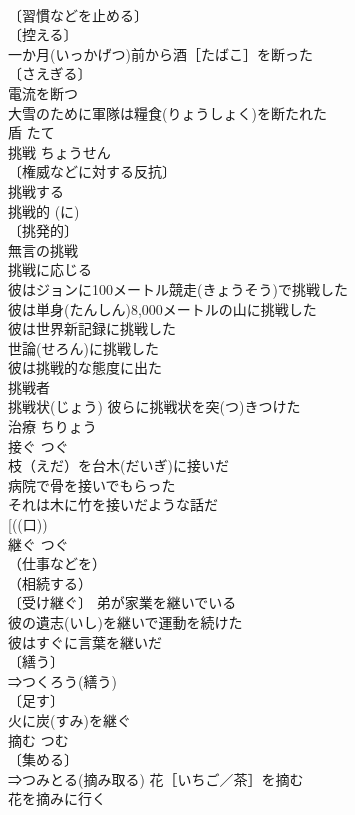 \documentclass[8pt]{extreport}
\begin{document}
\begin{CJK}{UTF8}{min}
\\	〔習慣などを止める〕
\\	〔控える〕
\\	一か月(いっかげつ)前から酒［たばこ］を断った 
\\	〔さえぎる〕
\\	電流を断つ 
\\	大雪のために軍隊は糧食(りょうしょく)を断たれた 
\\	盾	たて	
\\	挑戦	ちょうせん	
\\	〔権威などに対する反抗〕
\\	挑戦する 
\\	挑戦的 (に) 
\\	〔挑発的〕
\\	無言の挑戦 
\\	挑戦に応じる 
\\	彼はジョンに100メートル競走(きょうそう)で挑戦した 
\\	彼は単身(たんしん)8,000メートルの山に挑戦した 
\\	彼は世界新記録に挑戦した 
\\	世論(せろん)に挑戦した 
\\	彼は挑戦的な態度に出た 
\\	挑戦者 
\\	挑戦状(じょう) 彼らに挑戦状を突(つ)きつけた 
\\	治療	ちりょう	
\\	接ぐ	つぐ	
\\	枝（えだ）を台木(だいぎ)に接いだ 
\\	病院で骨を接いでもらった 
\\	それは木に竹を接いだような話だ 
\\	[((口)) 
\\	継ぐ	つぐ	
\\	（仕事などを）
\\	（相続する）
\\	〔受け継ぐ〕 弟が家業を継いでいる 
\\	彼の遺志(いし)を継いで運動を続けた 
\\	彼はすぐに言葉を継いだ 
\\	〔繕う〕
\\	⇒つくろう(繕う)　
\\	〔足す〕
\\	火に炭(すみ)を継ぐ 
\\	摘む	つむ	
\\	〔集める〕
\\	⇒つみとる(摘み取る) 花［いちご／茶］を摘む 
\\	花を摘みに行く 

\end{CJK}
\end{document}
